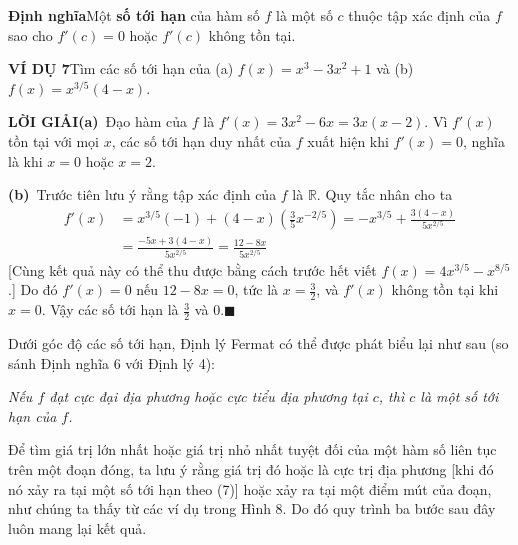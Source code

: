 \begin{minipage}[t]{0.71\textwidth}
    \vspace{0pt}%
    \begin{definitionbox}
    \noindent{}\quad\textbf{\color{stewartred}Định nghĩa}\quad Một \textbf{số tới hạn} của hàm số $f$ là một số $c$ thuộc tập xác định của $f$ sao cho $f'(c) = 0$ hoặc $f'(c)$ không tồn tại.
    \end{definitionbox}

    \vspace{9pt}
    \noindent\textbf{\textsf{\color{stewartcyan}VÍ DỤ 7}}\quad Tìm các số tới hạn của (a) $f(x) = x^3 - 3x^2 + 1$ và (b) $f(x) = x^{3/5}(4 - x)$.

    \vspace{5pt}
    \noindent\textbf{\textsf{\color{stewartcyan}LỜI GIẢI}}\quad\textbf{(a)}~Đạo hàm của $f$ là $f'(x) = 3x^2 - 6x = 3x(x - 2)$. Vì $f'(x)$ tồn tại với mọi $x$, các số tới hạn duy nhất của $f$ xuất hiện khi $f'(x) = 0$, nghĩa là khi $x = 0$ hoặc $x = 2$.

    \vspace{4pt}
    \noindent\textbf{(b)}~Trước tiên lưu ý rằng tập xác định của $f$ là $\mathbb{R}$. Quy tắc nhân cho ta
    \begin{align*}
    f'(x) &= x^{3/5}(-1) + (4 - x)\left(\tfrac{3}{5}x^{-2/5}\right) = -x^{3/5} + \frac{3(4 - x)}{5x^{2/5}} \\[4pt]
    &= \frac{-5x + 3(4 - x)}{5x^{2/5}} = \frac{12 - 8x}{5x^{2/5}}
    \end{align*}
    [Cùng kết quả này có thể thu được bằng cách trước hết viết $f(x) = 4x^{3/5} - x^{8/5}$.] Do đó $f'(x) = 0$ nếu $12 - 8x = 0$, tức là $x = \frac{3}{2}$, và $f'(x)$ không tồn tại khi $x = 0$. Vậy các số tới hạn là $\frac{3}{2}$ và $0$.\hfill{\color{stewartcyan}$\blacksquare$}

    \vspace{7pt}
    \noindent Dưới góc độ các số tới hạn, Định lý Fermat có thể được phát biểu lại như sau (so sánh Định nghĩa 6 với Định lý 4):

    \vspace{5pt}
    \begin{definitionbox}
    \noindent{}\quad\textit{Nếu $f$ đạt cực đại địa phương hoặc cực tiểu địa phương tại $c$, thì $c$ là một số tới hạn của $f$.}
    \end{definitionbox}

    \vspace{5pt}
    \noindent Để tìm giá trị lớn nhất hoặc giá trị nhỏ nhất tuyệt đối của một hàm số liên tục trên một đoạn đóng, ta lưu ý rằng giá trị đó hoặc là cực trị địa phương [khi đó nó xảy ra tại một số tới hạn theo (7)] hoặc xảy ra tại một điểm mút của đoạn, như chúng ta thấy từ các ví dụ trong Hình 8. Do đó quy trình ba bước sau đây luôn mang lại kết quả.


\end{minipage}
